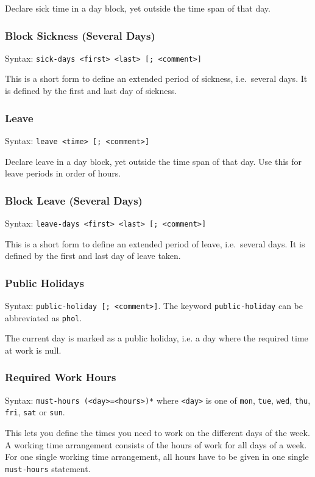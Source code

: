 \documentclass[11pt]{article}
\begin{document}
Declare sick time in a day block, yet outside the time span of that day.

\subsubsection{Block Sickness (Several Days)}

Syntax: \verb:sick-days <first> <last> [; <comment>]:

This is a short form to define an extended period of sickness, i.e.\ several days. It is defined by the first and last day of sickness.

\subsubsection{Leave}

Syntax: \verb:leave <time> [; <comment>]:

Declare leave in a day block, yet outside the time span of that day. Use this for leave periods in order of hours.

\subsubsection{Block Leave (Several Days)}

Syntax: \verb:leave-days <first> <last> [; <comment>]:

This is a short form to define an extended period of leave, i.e.\ several days. It is defined by the first and last day of leave taken.

\subsubsection{Public Holidays}

Syntax: \verb:public-holiday [; <comment>]:.
The keyword \verb:public-holiday: can be abbreviated as \verb:phol:.

The current day is marked as a public holiday, i.e. a day where the required time at work is null.

\subsubsection{Required Work Hours}

Syntax: \verb:must-hours (<day>=<hours>)*: where \verb:<day>: is one of \verb:mon:, \verb:tue:, \verb:wed:, \verb:thu:, \verb:fri:, \verb:sat: or \verb:sun:.

This lets you define the times you need to work on the different days of the week. A working time arrangement consists of the hours of work for all days of a week. For one single working time arrangement, all hours have to be given in one single \verb:must-hours: statement.
\end{document}
